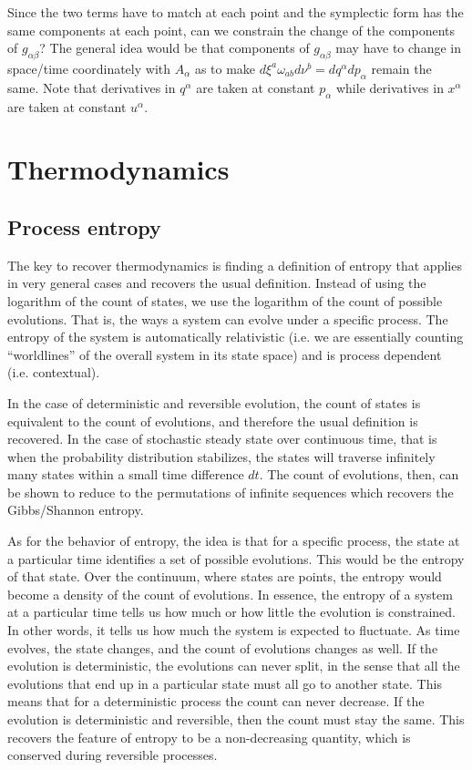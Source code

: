 \documentclass[11pt,letterpaper,fleqn]{memoir} %
\begin{document}
Since the two terms have to match at each point and the symplectic form has the same components at each point, can we constrain the change of the components of $g_{\alpha\beta}$? The general idea would be that components of $g_{\alpha\beta}$ may have to change in space/time coordinately with $A_\alpha$ as to make $d\xi^a \omega_{ab}d\nu^b = dq^\alpha dp_\alpha$ remain the same. Note that derivatives in $q^\alpha$ are taken at constant $p_\alpha$ while derivatives in $x^\alpha$ are taken at constant $u^\alpha$.

\section{Thermodynamics}

\subsection{Process entropy}

The key to recover thermodynamics is finding a definition of entropy that applies in very general cases and recovers the usual definition. Instead of using the logarithm of the count of states, we use the logarithm of the count of possible evolutions. That is, the ways a system can evolve under a specific process. The entropy of the system is automatically relativistic (i.e. we are essentially counting ``worldlines'' of the overall system in its state space) and is process dependent (i.e. contextual).

In the case of deterministic and reversible evolution, the count of states is equivalent to the count of evolutions, and therefore the usual definition is recovered. In the case of stochastic steady state over continuous time, that is when the probability distribution stabilizes, the states will traverse infinitely many states within a small time difference $dt$. The count of evolutions, then, can be shown to reduce to the permutations of infinite sequences which recovers the Gibbs/Shannon entropy.

As for the behavior of entropy, the idea is that for a specific process, the state at a particular time identifies a set of possible evolutions. This would be the entropy of that state. Over the continuum, where states are points, the entropy would become a density of the count of evolutions. In essence, the entropy of a system at a particular time tells us how much or how little the evolution is constrained. In other words, it tells us how much the system is expected to fluctuate.  As time evolves, the state changes, and the count of evolutions changes as well. If the evolution is deterministic, the evolutions can never split, in the sense that all the evolutions that end up in a particular state must all go to another state. This means that for a deterministic process the count can never decrease. If the evolution is deterministic and reversible, then the count must stay the same. This recovers the feature of entropy to be a non-decreasing quantity, which is conserved during reversible processes.
\end{document}
